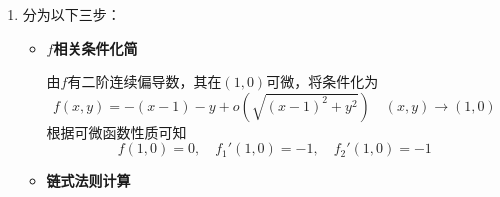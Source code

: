 \documentclass[a4paper,UTF8,fontset=windows,AutoFakeBold]{ctexart}
\newcommand*{\er}{\mathrm{e}}
\newcommand*{\rb}{\mathbb{R}}
\theoremstyle{ex}
\begin{document}
\begin{enumerate}
\begin{enumerate}
        由于(注意之前推导可发现$u$对$y$的一阶偏导数与$x$无关，因此二阶偏导数也与$x$无关，在任何$x$处相同)
        $$f''(x)=\frac{\partial^2u}{\partial x^2}\bigg|_{(x,0)},\quad g''(y)=C'(y)=\frac{\partial h_2'(x,y)}{\partial y}=\frac{\partial^2u}{\partial y^2}\bigg|_{(x,y)}$$
        利用$h$具有连续二阶偏导数可知$f$、$g$均二阶连续可导。从而得证。。

        \item
        由于$u>0$对任何$x$、$y$成立，直接计算可知
        $$\frac{\partial \ln u}{\partial x}=\frac{1}{u}\frac{\partial u}{\partial x}$$
        进一步得到
        $$\frac{\partial^2z}{\partial x\partial y}=\frac{\partial}{\partial y}\bigg(\frac{1}{u}\frac{\partial u}{\partial x}\bigg)=-\frac{1}{u^2}\frac{\partial u}{\partial y}\frac{\partial u}{\partial x}+\frac{1}{u}\frac{\partial^2u}{\partial x\partial y}$$
        右侧化简即为
        $$\frac{1}{u^2}\bigg(u\frac{\partial^2u}{\partial x\partial y}-\frac{\partial u}{\partial y}\frac{\partial u}{\partial x}\bigg)=0$$
        从而得证。

        \item
        记$z=\ln h(x,y)$，由(b)与(a)可知存在$(0,+\infty)$上二阶连续可导的函数$f$与$\rb$上二阶连续可导的函数$g$使得
        $$\ln h(x,y)=f(x)+g(y)$$
        代入两个条件取$\ln$可发现
        $$\forall x>0,\quad\ln h(x,0)=\ln x-\frac{x^2}{2}$$
        $$\forall y\in\rb,\quad\ln h(1,y)=-\frac{1+y^2}{2}$$
        从而在$D$中有
        $$f(x)+g(0)=\ln x-\frac{x^2}{2},\quad f(1)+g(y)=-\frac{1+y^2}{2}$$
        在第一式中代入$x=1$可发现$f(1)+g(0)=-\frac{1}{2}$，求和可得
        $$f(x)+g(y)=\ln x-\frac{x^2}{2}-\frac{1+y^2}{2}-f(1)-g(0)=\ln x-\frac{x^2}{2}-\frac{1+y^2}{2}+\frac{1}{2}$$
        由于这就是$\ln h(x,y)$，化简即知
        $$h(x,y)=x\er^{-\frac{x^2+y^2}{2}}$$
        可验证其符合条件，从而这就是唯一满足要求的$h(x,y)$。
    \end{enumerate}

    \item
    分为以下三步：
    \begin{itemize}
        \item $f$\textbf{相关条件化简}
        
        由$f$有二阶连续偏导数，其在$(1,0)$可微，将条件化为
        $$f(x,y)=-(x-1)-y+o(\sqrt{(x-1)^2+y^2})\quad(x,y)\to(1,0)$$
        根据可微函数性质可知
        $$f(1,0)=0,\quad f_1'(1,0)=-1,\quad f_2'(1,0)=-1$$

        \item \textbf{链式法则计算}
        

\end{itemize}
\end{enumerate}
\end{document}
